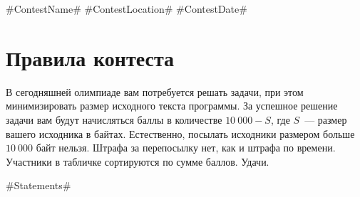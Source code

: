 \documentclass [11pt, a4paper, oneside] {article}
\begin{document}
\contest
{#ContestName#}%
{#ContestLocation#}%
{#ContestDate#}%


\renewcommand{\t}{\texttt}

\section*{Правила контеста}

В сегодняшней олимпиаде вам потребуется решать задачи, при этом минимизировать
размер исходного текста программы. За успешное решение задачи
вам будут начисляться баллы в количестве $10\ 000 - S$, где $S$~--- размер вашего
исходника в байтах.
Естественно, посылать исходники размером больше $10\ 000$ байт нельзя.
Штрафа за перепосылку нет, как и штрафа по времени.
Участники в табличке сортируются по сумме баллов.
Удачи.

\newpage

#Statements#
\end{document}
